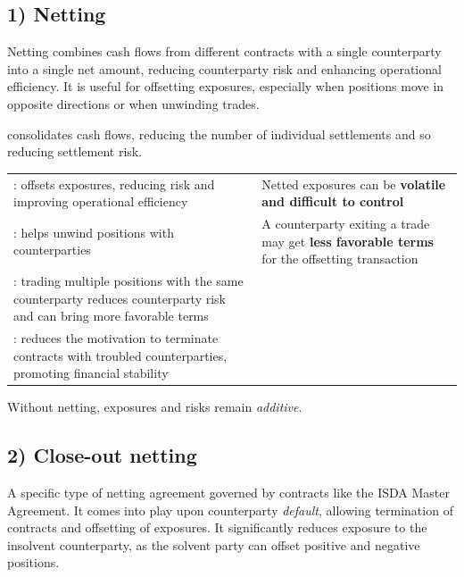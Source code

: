 \subsection*{1) Netting}

Netting combines cash flows from different contracts with a single counterparty
into a single net amount, reducing counterparty risk and enhancing operational
efficiency. It is useful for offsetting exposures, especially when positions move
in opposite directions or when unwinding trades.

 consolidates cash flows, reducing the number of individual
settlements and so reducing settlement risk.

\begin{center}
\footnotesize
\begin{tabular}{L{7.0cm} L{7.5cm}}
\toprule
{} &  \\
\midrule
{}: offsets exposures, reducing risk and improving
operational efficiency &
  Netted exposures can be \textbf{volatile and difficult to control} \\
: helps unwind positions with counterparties &
  A counterparty exiting a trade may get \textbf{less favorable terms} for the
  offsetting transaction \\
: trading multiple positions with the same
counterparty reduces counterparty risk and can bring more favorable terms & \\
: reduces the motivation to terminate contracts with
troubled counterparties, promoting financial stability & \\
\bottomrule
\end{tabular}
\end{center}

Without netting, exposures and risks remain \emph{additive}.

\subsection*{2) Close-out netting}

A specific type of netting agreement governed by contracts like the ISDA Master
Agreement. It comes into play upon counterparty \emph{default}, allowing
termination of contracts and offsetting of exposures. It significantly reduces
exposure to the insolvent counterparty, as the solvent party can offset positive
and negative positions.

